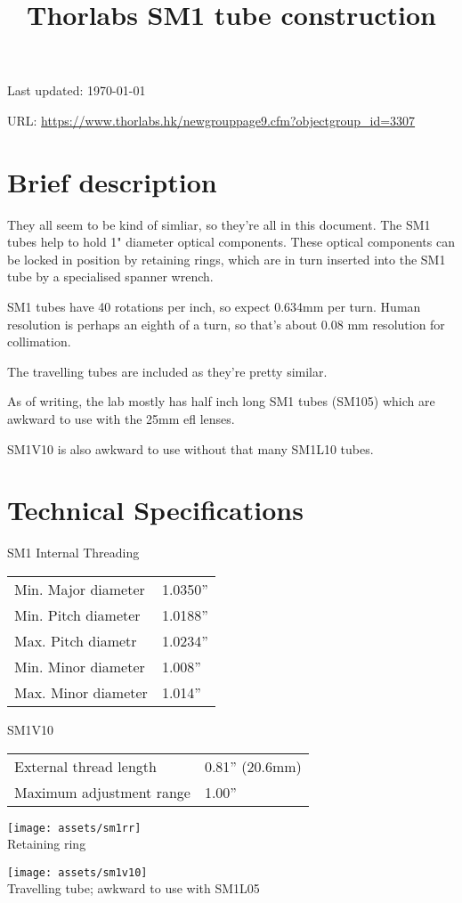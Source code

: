 \documentclass{article}
\title{\vspace{-4cm}Thorlabs SM1 tube construction}
\date{}
\begin{document}
\maketitle

\vspace{-1cm}

Last updated: \today

URL: \url{https://www.thorlabs.hk/newgrouppage9.cfm?objectgroup_id=3307}

\begin{multicols}{2}

\section{Brief description}

They all seem to be kind of simliar, so they're all in this document. The SM1 tubes help to hold 1" diameter optical components. These optical components can be locked in position by retaining rings, which are in turn inserted into the SM1 tube by a specialised spanner wrench.

SM1 tubes have 40 rotations per inch, so expect 0.634mm per turn. Human resolution is perhaps an eighth of a turn, so that's about 0.08 mm resolution for collimation.

The travelling tubes are included as they're pretty similar.

As of writing, the lab mostly has half inch long SM1 tubes (SM105) which are awkward to use with the 25mm efl lenses.

SM1V10 is also awkward to use without that many SM1L10 tubes.

\section{Technical Specifications}

SM1 Internal Threading

\begin{tabular}{|l|l|}
  Min. Major diameter & 1.0350''\\
  Min. Pitch diameter & 1.0188''\\
  Max. Pitch diametr & 1.0234'' \\
  Min. Minor diameter & 1.008''\\
  Max. Minor diameter & 1.014''
\end{tabular}%

\noindent SM1V10

\begin{tabular}{|l|l|}
External thread length & 0.81'' (20.6mm)\\
Maximum adjustment range & 1.00''
\end{tabular}%


\end{multicols}

\begin{center}
\texttt{[image: assets/sm1rr]} \\
Retaining ring
\end{center}


\begin{center}
\texttt{[image: assets/sm1v10]}\\
Travelling tube; awkward to use with SM1L05
\end{center}
\end{document}
